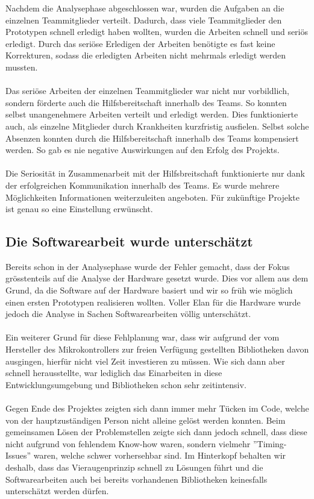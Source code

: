 Nachdem die Analysephase abgeschlossen war, wurden die Aufgaben an die einzelnen Teammitglieder verteilt. 
Dadurch, dass viele Teammitglieder den Prototypen schnell erledigt haben wollten, wurden die Arbeiten schnell und seriös erledigt. Durch das seriöse Erledigen der Arbeiten benötigte es fast keine Korrekturen, sodass die erledigten Arbeiten nicht mehrmals erledigt werden mussten.\\
\\
Das seriöse Arbeiten der einzelnen Teammitglieder war nicht nur vorbildlich, sondern förderte auch die Hilfsbereitschaft innerhalb des Teams. So konnten selbst unangenehmere Arbeiten verteilt und erledigt werden. Dies funktionierte auch, als einzelne Mitglieder durch Krankheiten kurzfristig ausfielen. Selbst solche Absenzen konnten durch die Hilfsbereitschaft innerhalb des Teams kompensiert werden. So gab es nie negative Auswirkungen auf den Erfolg des Projekts.\\
\\
Die Seriosität in Zusammenarbeit mit der Hilfsbreitschaft funktionierte nur dank der erfolgreichen Kommunikation innerhalb des Teams. Es wurde mehrere Möglichkeiten Informationen weiterzuleiten angeboten. Für zukünftige Projekte ist genau so eine Einstellung erwünscht. 

\subsection{Die Softwarearbeit wurde unterschätzt}

Bereits schon in der Analysephase wurde der Fehler gemacht, dass der Fokus grösstenteils auf die Analyse der Hardware gesetzt wurde. Dies vor allem aus dem Grund, da die Software auf der Hardware basiert und wir so früh wie möglich einen ersten Prototypen realisieren wollten. Voller Elan für die Hardware wurde jedoch die Analyse in Sachen Softwarearbeiten völlig unterschätzt.\\
\\
Ein weiterer Grund für diese Fehlplanung war, dass wir aufgrund der vom Hersteller des Mikrokontrollers zur freien Verfügung gestellten Bibliotheken davon ausgingen, hierfür nicht viel Zeit investieren zu müssen. Wie sich dann aber schnell herausstellte, war lediglich das Einarbeiten in diese Entwicklungsumgebung und Bibliotheken schon sehr zeitintensiv.\\
\\
Gegen Ende des Projektes zeigten sich dann immer mehr Tücken im Code, welche von der hauptzuständigen Person nicht alleine gelöst werden konnten. Beim gemeinsamen Lösen der Problemstellen zeigte sich dann jedoch schnell, dass diese nicht aufgrund von fehlendem Know-how waren, sondern vielmehr ''Timing-Issues'' waren, welche schwer vorhersehbar sind. Im Hinterkopf behalten wir deshalb, dass das Vieraugenprinzip schnell zu Lösungen führt und die Softwarearbeiten auch bei bereits vorhandenen Bibliotheken keinesfalls unterschätzt werden dürfen.



